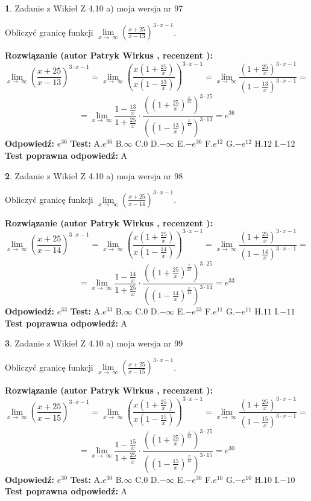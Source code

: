 \documentclass[12pt, a4paper]{article}
\theoremstyle{definition} %
\newtheorem{zad}{}
\newcommand{\zadStart}[1]{\begin{zad}#1\newline}
\newcommand{\zadStop}{\end{zad}}
\newcommand{\rozwStart}[2]{\noindent \textbf{Rozwiązanie (autor #1 , recenzent #2): }\newline}
\newcommand{\rozwStop}{\newline}
\newcommand{\odpStart}{\noindent \textbf{Odpowiedź:}\newline}
\newcommand{\odpStop}{\newline}
\newcommand{\testStart}{\noindent \textbf{Test:}\newline}
\newcommand{\testStop}{\newline}
\newcommand{\kluczStart}{\noindent \textbf{Test poprawna odpowiedź:}\newline}
\newcommand{\kluczStop}{\newline}
\begin{document}
\zadStart{Zadanie z Wikieł Z 4.10 a) moja wersja nr 97}

Obliczyć granicę funkcji  $\lim\limits_{x\to\ \infty}(\frac{x+25}{x-13})^{3\cdot x-1}$.
\zadStop
\rozwStart{Patryk Wirkus}{}
$$\lim\limits_{x\to\ \infty}(\frac{x+25}{x-13})^{3\cdot x-1} = \lim\limits_{x\to\ \infty}(\frac{x(1+\frac{25}{x})}{x(1-\frac{13}{x})})^{3\cdot x-1}=\lim\limits_{x\to\ \infty}\frac{(1+\frac{25}{x})^{3\cdot x-1}}{(1-\frac{13}{x})^{3\cdot x-1}}=$$
$$=\lim\limits_{x\to\ \infty}\frac{1-\frac{13}{x}}{1+\frac{25}{x}}\cdot\frac{((1+\frac{25}{x})^{\frac{x}{25}})^{3\cdot25}}{((1-\frac{13}{x})^{\frac{x}{13}})^{3\cdot13}}=e^{36}$$
\rozwStop
\odpStart
$e^{36}$
\odpStop
\testStart
A.$e^{36}$ B.$\infty$ C.$0$ D.$-\infty$ E.$-e^{36}$
F.$e^{12}$ G.$-e^{12}$
H.$12$
I.$-12$
\testStop
\kluczStart
A
\kluczStop



\zadStart{Zadanie z Wikieł Z 4.10 a) moja wersja nr 98}

Obliczyć granicę funkcji  $\lim\limits_{x\to\ \infty}(\frac{x+25}{x-14})^{3\cdot x-1}$.
\zadStop
\rozwStart{Patryk Wirkus}{}
$$\lim\limits_{x\to\ \infty}(\frac{x+25}{x-14})^{3\cdot x-1} = \lim\limits_{x\to\ \infty}(\frac{x(1+\frac{25}{x})}{x(1-\frac{14}{x})})^{3\cdot x-1}=\lim\limits_{x\to\ \infty}\frac{(1+\frac{25}{x})^{3\cdot x-1}}{(1-\frac{14}{x})^{3\cdot x-1}}=$$
$$=\lim\limits_{x\to\ \infty}\frac{1-\frac{14}{x}}{1+\frac{25}{x}}\cdot\frac{((1+\frac{25}{x})^{\frac{x}{25}})^{3\cdot25}}{((1-\frac{14}{x})^{\frac{x}{14}})^{3\cdot14}}=e^{33}$$
\rozwStop
\odpStart
$e^{33}$
\odpStop
\testStart
A.$e^{33}$ B.$\infty$ C.$0$ D.$-\infty$ E.$-e^{33}$
F.$e^{11}$ G.$-e^{11}$
H.$11$
I.$-11$
\testStop
\kluczStart
A
\kluczStop



\zadStart{Zadanie z Wikieł Z 4.10 a) moja wersja nr 99}

Obliczyć granicę funkcji  $\lim\limits_{x\to\ \infty}(\frac{x+25}{x-15})^{3\cdot x-1}$.
\zadStop
\rozwStart{Patryk Wirkus}{}
$$\lim\limits_{x\to\ \infty}(\frac{x+25}{x-15})^{3\cdot x-1} = \lim\limits_{x\to\ \infty}(\frac{x(1+\frac{25}{x})}{x(1-\frac{15}{x})})^{3\cdot x-1}=\lim\limits_{x\to\ \infty}\frac{(1+\frac{25}{x})^{3\cdot x-1}}{(1-\frac{15}{x})^{3\cdot x-1}}=$$
$$=\lim\limits_{x\to\ \infty}\frac{1-\frac{15}{x}}{1+\frac{25}{x}}\cdot\frac{((1+\frac{25}{x})^{\frac{x}{25}})^{3\cdot25}}{((1-\frac{15}{x})^{\frac{x}{15}})^{3\cdot15}}=e^{30}$$
\rozwStop
\odpStart
$e^{30}$
\odpStop
\testStart
A.$e^{30}$ B.$\infty$ C.$0$ D.$-\infty$ E.$-e^{30}$
F.$e^{10}$ G.$-e^{10}$
H.$10$
I.$-10$
\testStop
\kluczStart
A
\kluczStop
\end{document}
